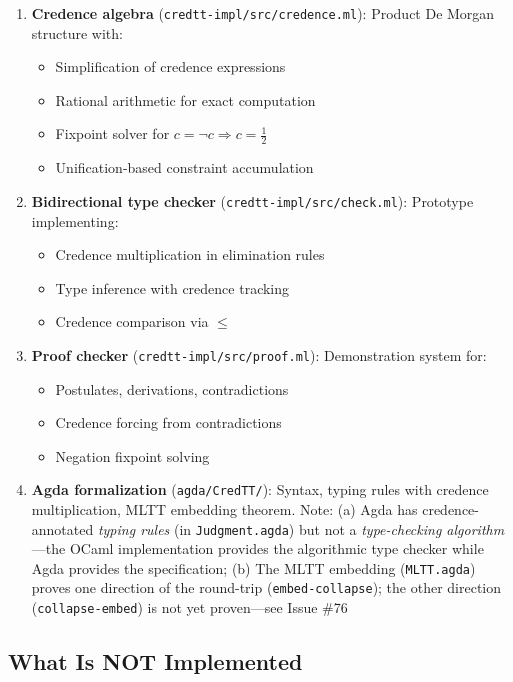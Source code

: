 \documentclass[11pt,a4paper]{article}
\newcommand{\negc}{\neg}
\begin{document}
\begin{enumerate}
    \item \textbf{Credence algebra} (\texttt{credtt-impl/src/credence.ml}): Product De Morgan structure with:
    \begin{itemize}
        \item Simplification of credence expressions
        \item Rational arithmetic for exact computation
        \item Fixpoint solver for $c = \negc c \Rightarrow c = \frac{1}{2}$
        \item Unification-based constraint accumulation
    \end{itemize}
    \item \textbf{Bidirectional type checker} (\texttt{credtt-impl/src/check.ml}): Prototype implementing:
    \begin{itemize}
        \item Credence multiplication in elimination rules
        \item Type inference with credence tracking
        \item Credence comparison via $\leq$
    \end{itemize}
    \item \textbf{Proof checker} (\texttt{credtt-impl/src/proof.ml}): Demonstration system for:
    \begin{itemize}
        \item Postulates, derivations, contradictions
        \item Credence forcing from contradictions
        \item Negation fixpoint solving
    \end{itemize}
    \item \textbf{Agda formalization} (\texttt{agda/CredTT/}): Syntax, typing rules with credence multiplication, MLTT embedding theorem. Note: (a) Agda has credence-annotated \emph{typing rules} (in \texttt{Judgment.agda}) but not a \emph{type-checking algorithm}---the OCaml implementation provides the algorithmic type checker while Agda provides the specification; (b) The MLTT embedding (\texttt{MLTT.agda}) proves one direction of the round-trip (\texttt{embed-collapse}); the other direction (\texttt{collapse-embed}) is not yet proven---see Issue \#76
\end{enumerate}

\subsection{What Is NOT Implemented}
\end{document}
